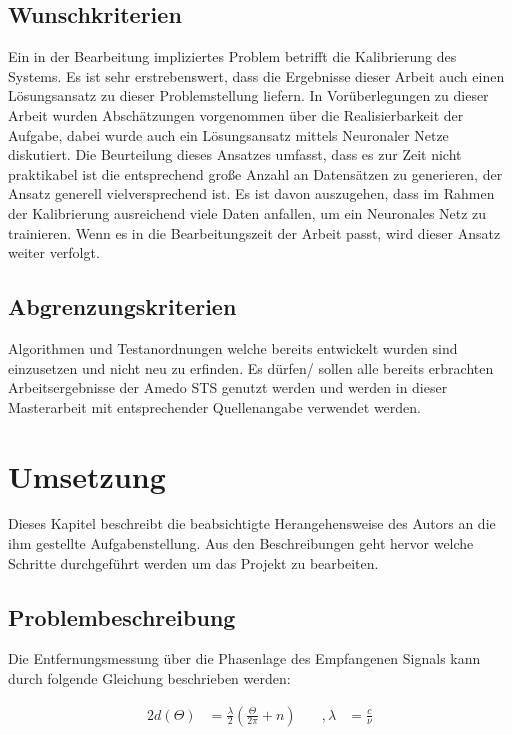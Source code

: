 \documentclass[a4paper,12pt,fleqn]{article}
\begin{document}
\subsection{Wunschkriterien}
Ein in der Bearbeitung impliziertes Problem betrifft die Kalibrierung des Systems. Es ist sehr erstrebenswert, dass die Ergebnisse dieser Arbeit auch einen Lösungsansatz zu dieser Problemstellung liefern. In Vorüberlegungen zu dieser Arbeit wurden Abschätzungen vorgenommen über die Realisierbarkeit der Aufgabe, dabei wurde auch ein Lösungsansatz mittels Neuronaler Netze diskutiert. Die Beurteilung dieses Ansatzes umfasst, dass es zur Zeit nicht praktikabel ist die entsprechend große Anzahl an Datensätzen zu generieren, der Ansatz generell vielversprechend ist. Es ist davon auszugehen, dass im Rahmen der Kalibrierung ausreichend viele Daten anfallen, um ein Neuronales Netz zu trainieren. Wenn es in die Bearbeitungszeit der Arbeit passt, wird dieser Ansatz weiter verfolgt.

\subsection{Abgrenzungskriterien}
Algorithmen und Testanordnungen welche bereits entwickelt wurden sind einzusetzen und nicht neu zu erfinden. Es dürfen/ sollen alle bereits erbrachten Arbeitsergebnisse der Amedo STS genutzt werden und werden in dieser Masterarbeit mit entsprechender Quellenangabe verwendet werden.

\section{Umsetzung}
Dieses Kapitel beschreibt die beabsichtigte Herangehensweise des Autors an die
ihm gestellte Aufgabenstellung. Aus den Beschreibungen geht hervor welche Schritte durchgeführt werden um das Projekt zu bearbeiten.

\subsection{Problembeschreibung}

Die Entfernungsmessung über die Phasenlage des Empfangenen Signals kann durch folgende Gleichung beschrieben werden:

\begin{alignat}{2}\label{eq:Wavenumbers}
 	d(\Theta)&=\frac{\lambda}{2}(\frac{\Theta}{2\pi}+n) &\quad
 	,\lambda&=\frac{c}{\nu}
\end{alignat}
\end{document}
